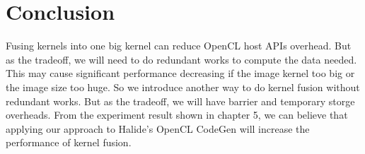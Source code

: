 \chapter{Conclusion}

    Fusing kernels into one big kernel can reduce OpenCL host APIs overhead. But as the tradeoff, we will need to do redundant works to compute the data needed. This may cause significant performance decreasing if the image kernel too big or the image size too huge. So we introduce another way to do kernel fusion without redundant works. But as the tradeoff, we will have barrier and temporary storge overheads. From the experiment result shown in chapter 5, we can believe that applying our approach to Halide's OpenCL CodeGen will increase the performance of kernel fusion.
